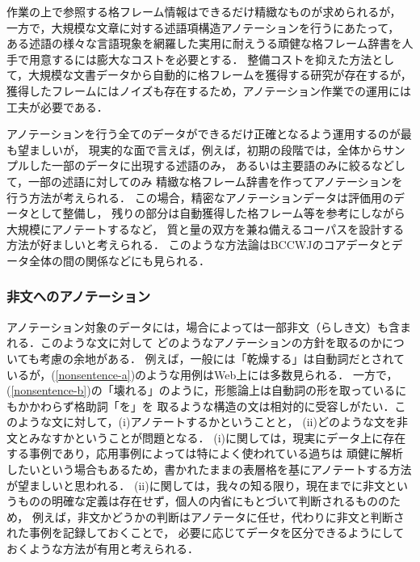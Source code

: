 \documentclass[japanese]{jnlp_1.4}
\begin{document}
作業の上で参照する格フレーム情報はできるだけ精緻なものが求められるが，
一方で，大規模な文章に対する述語項構造アノテーションを行うにあたって，
ある述語の様々な言語現象を網羅した実用に耐えうる頑健な格フレーム辞書を人手で用意するには膨大なコストを必要とする．
整備コストを抑えた方法として，大規模な文書データから自動的に格フレームを獲得する研究が存在するが\cite{kawahara2006case}，
獲得したフレームにはノイズも存在するため，アノテーション作業での運用には工夫が必要である．

アノテーションを行う全てのデータができるだけ正確となるよう運用するのが最も望ましいが，
現実的な面で言えば，例えば，初期の段階では，全体からサンプルした一部のデータに出現する述語のみ，
あるいは主要語のみに絞るなどして，一部の述語に対してのみ
精緻な格フレーム辞書を作ってアノテーションを行う方法が考えられる．
この場合，精密なアノテーションデータは評価用のデータとして整備し，
残りの部分は自動獲得した格フレーム等を参考にしながら大規模にアノテートするなど，
質と量の双方を兼ね備えるコーパスを設計する方法が好ましいと考えられる．
このような方法論はBCCWJのコアデータとデータ全体の間の関係などにも見られる．


\subsubsection{非文へのアノテーション}
\label{sec:ungramatical-sentence}

アノテーション対象のデータには，場合によっては一部非文（らしき文）も含まれる．このような文に対して
どのようなアノテーションの方針を取るのかについても考慮の余地がある．
例えば，一般には「乾燥する」は自動詞だとされているが，(\ref{nonsentence-a})のような用例はWeb上には多数見られる．
一方で，(\ref{nonsentence-b})の「壊れる」のように，形態論上は自動詞の形を取っているにもかかわらず格助詞「を」を
取るような構造の文は相対的に受容しがたい．このような文に対して，(i)アノテートするかということと，
(ii)どのような文を非文とみなすかということが問題となる．
(i)に関しては，現実にデータ上に存在する事例であり，応用事例によっては特によく使われている過ちは
頑健に解析したいという場合もあるため，書かれたままの表層格を基にアノテートする方法が望ましいと思われる．
(ii)に関しては，我々の知る限り，現在までに非文というものの明確な定義は存在せず，個人の内省にもとづいて判断されるもののため，
例えば，非文かどうかの判断はアノテータに任せ，代わりに非文と判断された事例を記録しておくことで，
必要に応じてデータを区分できるようにしておくような方法が有用と考えられる．
\end{document}
